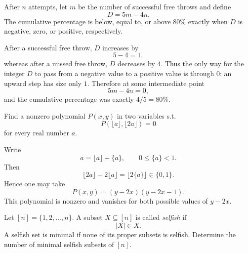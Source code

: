     \begin{solution}
        After $n$ attempts, let $m$ be the number of successful free throws and
        define
        \[
            D=5m-4n.
        \]
        The cumulative percentage is below, equal to, or above $80\%$ exactly
        when $D$ is negative, zero, or positive, respectively.

        After a successful free throw, $D$ increases by
        \[
            5-4=1,
        \]
        whereas after a missed free throw, $D$ decreases by $4$. Thus the only
        way for the integer $D$ to pass from a negative value to a positive
        value is through $0$: an upward step has size only $1$. Therefore at
        some intermediate point
        \[
            5m-4n=0,
        \]
        and the cumulative percentage was exactly $4/5=80\%$.
    \end{solution}

    \begin{expectedproblem}[2005 Putnam]
        Find a nonzero polynomial $P(x,y)$ in two variables s.t.
        \[
            P(\lfloor a\rfloor,\lfloor2a\rfloor)=0
        \]
        for every real number $a$.
    \end{expectedproblem}

    \begin{solution}
        Write
        \[
            a=\lfloor a\rfloor+\{a\},
            \qquad
            0\leq\{a\}<1.
        \]
        Then
        \[
            \lfloor2a\rfloor-2\lfloor a\rfloor
            =
            \lfloor2\{a\}\rfloor
            \in\{0,1\}.
        \]
        Hence one may take
        \[
            \boxed{
                P(x,y)=(y-2x)(y-2x-1)
            }.
        \]
        This polynomial is nonzero and vanishes for both possible values of
        $y-2x$.
    \end{solution}

    \begin{expectedproblem}[1996 Putnam]
        Let $[n]=\{1,2,\ldots,n\}$. A subset $X\subseteq[n]$ is called
        \emph{selfish} if
        \[
            |X|\in X.
        \]
        A selfish set is minimal if none of its proper subsets is selfish.
        Determine the number of minimal selfish subsets of $[n]$.
    \end{expectedproblem}

